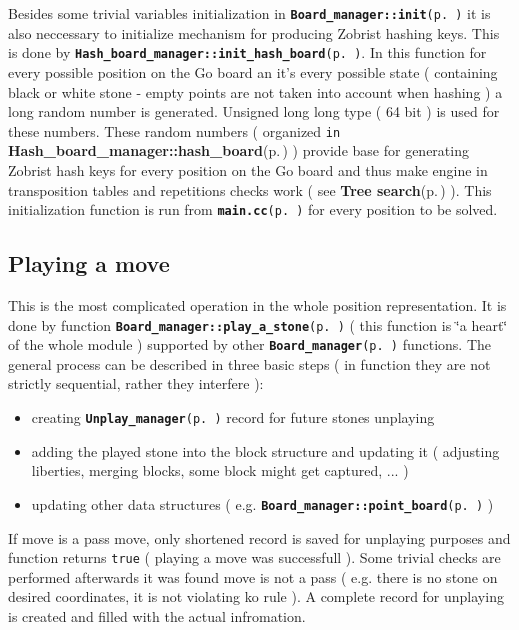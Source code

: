 Besides some trivial variables initialization in {\tt {\bf Board\_\-manager::init}{\rm (p.\,\pageref{classBoard__manager_a0})}} it is also neccessary to initialize mechanism for producing Zobrist hashing keys. This is done by {\tt {\bf Hash\_\-board\_\-manager::init\_\-hash\_\-board}{\rm (p.\,\pageref{classHash__board__manager_a7})}}. In this function for every possible position on the Go board an it's every possible state ( containing black or white stone - empty points are not taken into account when hashing ) a long random number is generated. Unsigned long long type ( 64 bit ) is used for these numbers. These random numbers ( organized {\tt in} {\bf Hash\_\-board\_\-manager::hash\_\-board}{\rm (p.\,\pageref{classHash__board__manager_r0})} ) provide base for generating Zobrist hash keys for every position on the Go board and thus make engine in transposition tables and repetitions checks work ( see {\bf Tree search}{\rm (p.\,\pageref{page_3})} ). This initialization function is run from {\tt {\bf main.cc}{\rm (p.\,\pageref{main_8cc})}} for every position to be solved.\subsection{Playing a move}\label{page_6_page_6__sec_3}
This is the most complicated operation in the whole position representation. It is done by function {\tt {\bf Board\_\-manager::play\_\-a\_\-stone}{\rm (p.\,\pageref{classBoard__manager_a4})}} ( this function is \char`\"{}a heart\char`\"{} of the whole module ) supported by other {\tt {\bf Board\_\-manager}{\rm (p.\,\pageref{classBoard__manager})}} functions. The general process can be described in three basic steps ( in function they are not strictly sequential, rather they interfere ):\begin{itemize}
\item creating {\tt {\bf Unplay\_\-manager}{\rm (p.\,\pageref{structUnplay__manager})}} record for future stones unplaying\item adding the played stone into the block structure and updating it ( adjusting liberties, merging blocks, some block might get captured, ... )\item updating other data structures ( e.g. {\tt {\bf Board\_\-manager::point\_\-board}{\rm (p.\,\pageref{classBoard__manager_o5})}} )\end{itemize}


If move is a pass move, only shortened record is saved for unplaying purposes and function returns {\tt true} ( playing a move was successfull ). Some trivial checks are performed afterwards it was found move is not a pass ( e.g. there is no stone on desired coordinates, it is not violating ko rule ). A complete record for unplaying is created and filled with the actual infromation.



